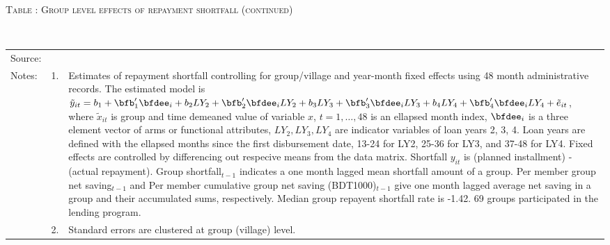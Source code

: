 \addtocounter{table}{-1}
\hspace{-1cm}\begin{minipage}[t]{14cm}
\hfil\textsc{\normalsize Table \thetable: Group level effects of repayment shortfall (continued)\label{tab shortfall group2}}\\
\setlength{\tabcolsep}{1pt}
\setlength{\baselineskip}{8pt}
\renewcommand{\arraystretch}{.6}
\hfil{}\\
\renewcommand{\arraystretch}{.8}
\setlength{\tabcolsep}{1pt}
\begin{tabular}{>{\hfill\scriptsize}p{1cm}<{}>{\hfill\scriptsize}p{.25cm}<{}>{\scriptsize}p{12cm}<{\hfill}}
Source:& \multicolumn{2}{l}{\scriptsize Estimated with GUK administrative data.}\\
Notes: & 1. & Estimates of repayment shortfall controlling for group/village and year-month fixed effects using 48 month administrative records. The estimated model is $\tilde{y}_{it}=b_{1}+\bfb'_{1}\bfdee_{i}+b_{2}LY_{2}+\bfb'_{2}\bfdee_{i}LY_{2}+b_{3}LY_{3}+\bfb'_{3}\bfdee_{i}LY_{3}+b_{4}LY_{4}+\bfb'_{4}\bfdee_{i}LY_{4}+\tilde{e}_{it}$, where $\tilde{x}_{it}$ is group and time demeaned value of variable $x$, $t=1,\dots, 48$ is an ellapsed month index, $\bfdee_{i}$ is a three element vector of arms or functional attributes, $LY_{2}, LY_{3}, LY_{4}$ are indicator variables of loan years 2, 3, 4. Loan years are defined with the ellapsed months since the first disbursement date, 13-24 for \textsf{LY2}, 25-36 for \textsf{LY3}, and 37-48 for \textsf{LY4}. Fixed effects are controlled by differencing out respecive means from the data matrix. Shortfall $y_{it}$ is (planned installment) - (actual repayment). \textsf{Group shortfall}$_{t-1}$ indicates a one month lagged mean shortfall amount of a group. \textsf{Per member group net saving}$_{t-1}$ and \textsf{Per member cumulative group net saving (BDT1000)}$_{t-1}$ give one month lagged average net saving in a group and their accumulated sums, respectively. Median group repayent shortfall rate is -1.42. 69 groups participated in the lending program. \\
& 2. & Standard errors are clustered at group (village) level.
\end{tabular}
\end{minipage}

